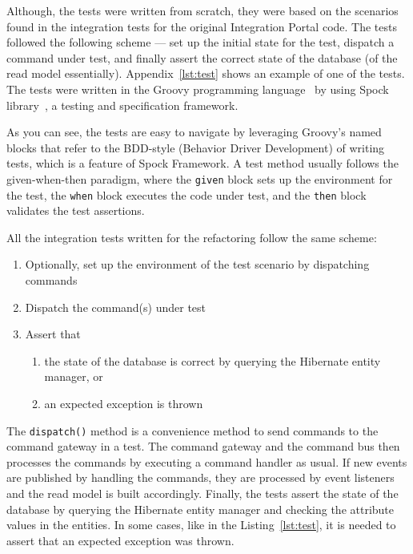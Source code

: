 \documentclass{book}
\begin{document}
Although, the tests were written from scratch, they were based on the
scenarios found in the integration tests for the original Integration
Portal code. The tests followed the following scheme --- set up the
initial state for the test, dispatch a command under test, and finally
assert the correct state of the database (of the
read model essentially). Appendix~\ref{lst:test} shows an
example of one of the tests. The tests were written in the Groovy
programming language~\cite{groovy} by using Spock library~\cite{spock},
a testing and specification framework.

As you can see, the tests are easy to navigate by leveraging Groovy's
named blocks that refer to the BDD-style (Behavior Driver Development)
of writing tests, which is a feature of Spock Framework. A test method
usually follows the given-when-then paradigm, where the \texttt{given}
block sets up the environment for the test, the \texttt{when} block
executes the code under test, and the \texttt{then} block validates the
test assertions.

All the integration tests written for the refactoring follow the same
scheme:

\begin{enumerate}
\def\labelenumi{\arabic{enumi}.}
\tightlist
\item
  Optionally, set up the environment of the test scenario by dispatching
  commands
\item
  Dispatch the command(s) under test
\item
  Assert that

  \begin{enumerate}
  \def\labelenumii{\alph{enumii})}
  \tightlist
  \item
    the state of the database is correct by querying the Hibernate
    entity manager, or
  \item
    an expected exception is thrown
  \end{enumerate}
\end{enumerate}

The \texttt{dispatch()} method is a convenience method to send commands
to the command gateway in a test. The command gateway and the command
bus then processes the commands by executing a command handler as usual.
If new events are published by handling the commands, they are processed
by event listeners and the read model is built accordingly. Finally, the
tests assert the state of the database by querying the Hibernate entity
manager and checking the attribute values in the entities. In some
cases, like in the Listing~\ref{lst:test}, it is needed to assert that an
expected exception was thrown.
\end{document}
